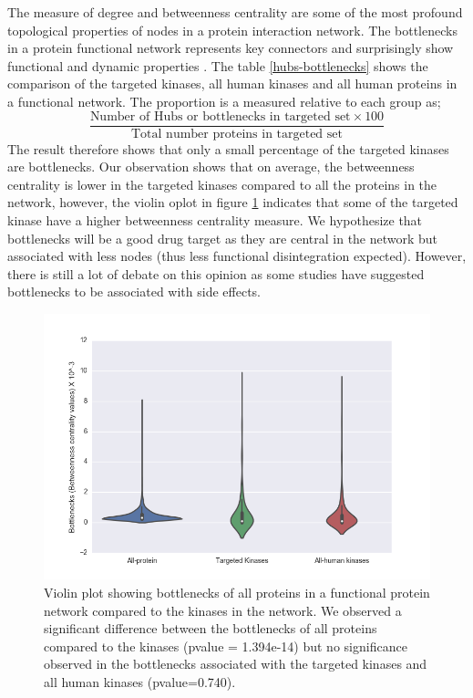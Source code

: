 \documentclass[a4paper, 11pt]{article}
\begin{document}
The measure of degree and betweenness centrality are some of the most profound topological properties of nodes in a protein interaction network. The bottlenecks in a protein functional network represents key connectors and surprisingly show functional and dynamic properties \cite{yu2007importance}. The table \ref{hubs-bottlenecks} shows the comparison of the targeted kinases, all human kinases and all human proteins in a functional network. The proportion is a measured relative to each group as; 
\[
\frac{\text{Number of Hubs or bottlenecks in targeted set} \times100 } {\text{Total number proteins in targeted set}}
\]
The result therefore shows that only a small percentage of the targeted kinases are bottlenecks. Our observation shows that on average, the betweenness centrality is lower in the targeted kinases compared to all the proteins in the network, however, the violin oplot in figure \ref{bottle_measured} indicates that some of the targeted kinase have a higher betweenness centrality measure. We hypothesize that bottlenecks will be a good drug target as they are central in the network but associated with less nodes (thus less functional disintegration expected). However, there is still a lot of debate on this opinion as some studies have suggested bottlenecks to be associated with side effects.

\begin{figure}[H]
	\includegraphics[width=.9\linewidth]{figures/bottlenecks_ff2.png}
	\centering
	\caption{Violin plot showing bottlenecks of all proteins in a functional protein network compared to the kinases in the network. We observed a significant difference between the bottlenecks of all proteins compared to the kinases (pvalue = 1.394e-14) but no significance observed in the bottlenecks associated with the targeted kinases and all human kinases (pvalue=0.740).}
	\label{bottle_measured}
\end{figure}
\end{document}
